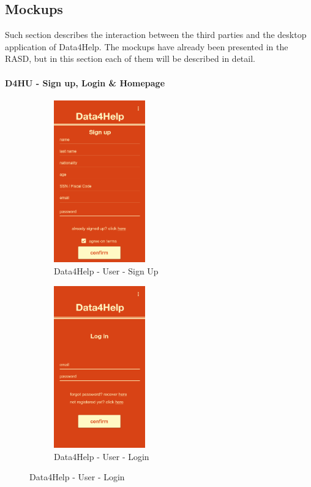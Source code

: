 {\color{secblue}\subsection{Mockups}}
Such section describes the interaction between the third parties and the desktop application of Data4Help.
The mockups have already been presented in the RASD, but in this section each of them will be described in detail.


\paragraph{D4HU - Sign up, Login \& Homepage}
\begin{figure}[H]
\centering
\begin{subfigure}{.33\textwidth}
  \centering
  \includegraphics[width=.9\linewidth, height = 7cm, keepaspectratio]{./Images/Mockups/Data4Help/D4HU/D4HU_SignUp.png}
  \caption{Data4Help - User - Sign Up}
\end{subfigure}%
\begin{subfigure}{.33\textwidth}
  \centering
  \includegraphics[width = .9\linewidth, height = 7cm, keepaspectratio]{./Images/Mockups/Data4Help/D4HU/D4HU_Login.png}
  \caption{Data4Help - User - Login}

\end{subfigure}
\end{figure}
